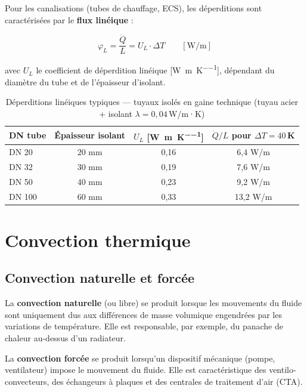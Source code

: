 Pour les canalisations (tubes de chauffage, ECS), les déperditions sont caractérisées par le \textbf{flux linéique} :

\begin{equation}
  \varphi_L = \frac{\dot{Q}}{L} = U_L \cdot \Delta T \qquad \left[\si{\watt\per\metre}\right]
\end{equation}

avec \(U_L\) le coefficient de déperdition linéique [\si{\watt\per\metre\per\kelvin}], dépendant du diamètre du tube et de l'épaisseur d'isolant.

\begin{table}[H]
  \centering
  \caption{Déperditions linéiques typiques — tuyaux isolés en gaine technique (tuyau acier + isolant $\lambda = 0{,}04$\,W/m·K)}
  \begin{tabular}{lccc}
    \toprule
    DN tube & Épaisseur isolant & $U_L$ [\si{\watt\per\metre\per\kelvin}] & $\dot{Q}/L$ pour $\Delta T = 40$\,K \\
    \midrule
    DN 20 & 20 mm & 0,16 & 6,4 W/m \\
    DN 32 & 30 mm & 0,19 & 7,6 W/m \\
    DN 50 & 40 mm & 0,23 & 9,2 W/m \\
    DN 100 & 60 mm & 0,33 & 13,2 W/m \\
    \bottomrule
  \end{tabular}
\end{table}

\section{Convection thermique}

\subsection{Convection naturelle et forcée}

\begin{definition}
  La \textbf{convection naturelle} (ou libre) se produit lorsque les mouvements du fluide
  sont uniquement dus aux différences de masse volumique engendrées par les variations de
  température. Elle est responsable, par exemple, du panache de chaleur au-dessus d'un
  radiateur.
\end{definition}

\begin{definition}
  La \textbf{convection forcée} se produit lorsqu'un dispositif mécanique (pompe, ventilateur)
  impose le mouvement du fluide. Elle est caractéristique des ventilo-convecteurs, des
  échangeurs à plaques et des centrales de traitement d'air (CTA).
\end{definition}

